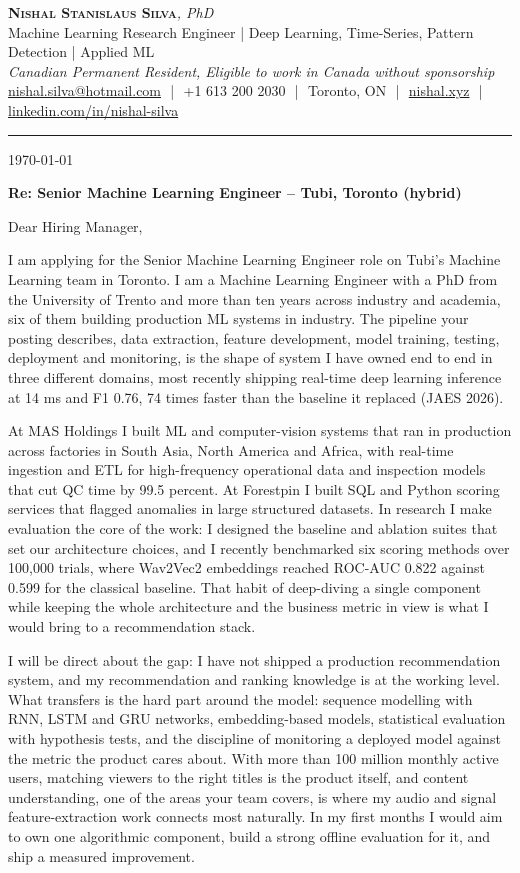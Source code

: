 \documentclass[11pt]{article}
\makeatletter
\newcommand{\clName}{Nishal Stanislaus Silva}
\newcommand{\clEmail}{nishal.silva@hotmail.com}
\newcommand{\clPhone}{+1 613 200 2030}
\newcommand{\clCity}{Toronto, ON}
\newcommand{\clSite}{https://nishal.xyz}
\newcommand{\clLinkedIn}{https://www.linkedin.com/in/nishal-silva}
\newcommand{\clStatus}{Canadian Permanent Resident, Eligible to work in Canada without sponsorship}
\newcommand{\clTagline}{Machine Learning Research Engineer | Deep Learning, Time-Series, Pattern Detection | Applied ML}
\newcommand{\clRole}{Senior Machine Learning Engineer}
\newcommand{\clCompany}{Tubi}
\newcommand{\clAddressee}{Dear Hiring Manager,}
\makeatother
\begin{document}
\pagestyle{empty}

\begin{center}
    {\LARGE \scshape \textbf{\clName}}{\large \textit{, PhD}}
    \\[1pt]
    {\small \clTagline}
    \\[1pt]
    {\footnotesize\textit{\clStatus}}
    \\[1pt]
    {\small
    \href{mailto:\clEmail}{\clEmail}
    \,\,|\,\, \clPhone
    \,\,|\,\, \clCity
    \,\,|\,\, \href{\clSite}{nishal.xyz}
    \,\,|\,\, \href{\clLinkedIn}{linkedin.com/in/nishal-silva}}
\end{center}

\rule{\linewidth}{0.4pt}\vspace{0.6em}

\today

\textbf{Re: \clRole{} -- \clCompany{}, Toronto (hybrid)}

\clAddressee

I am applying for the Senior Machine Learning Engineer role on Tubi's Machine Learning team in Toronto. I am a Machine Learning Engineer with a PhD from the University of Trento and more than ten years across industry and academia, six of them building production ML systems in industry. The pipeline your posting describes, data extraction, feature development, model training, testing, deployment and monitoring, is the shape of system I have owned end to end in three different domains, most recently shipping real-time deep learning inference at 14 ms and F1 0.76, 74 times faster than the baseline it replaced (JAES 2026).

At MAS Holdings I built ML and computer-vision systems that ran in production across factories in South Asia, North America and Africa, with real-time ingestion and ETL for high-frequency operational data and inspection models that cut QC time by 99.5 percent. At Forestpin I built SQL and Python scoring services that flagged anomalies in large structured datasets. In research I make evaluation the core of the work: I designed the baseline and ablation suites that set our architecture choices, and I recently benchmarked six scoring methods over 100,000 trials, where Wav2Vec2 embeddings reached ROC-AUC 0.822 against 0.599 for the classical baseline. That habit of deep-diving a single component while keeping the whole architecture and the business metric in view is what I would bring to a recommendation stack.

I will be direct about the gap: I have not shipped a production recommendation system, and my recommendation and ranking knowledge is at the working level. What transfers is the hard part around the model: sequence modelling with RNN, LSTM and GRU networks, embedding-based models, statistical evaluation with hypothesis tests, and the discipline of monitoring a deployed model against the metric the product cares about. With more than 100 million monthly active users, matching viewers to the right titles is the product itself, and content understanding, one of the areas your team covers, is where my audio and signal feature-extraction work connects most naturally. In my first months I would aim to own one algorithmic component, build a strong offline evaluation for it, and ship a measured improvement.
\end{document}
